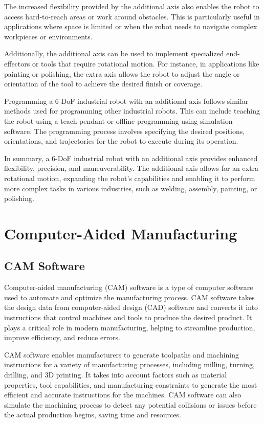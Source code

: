 The increased flexibility provided by the additional axis also enables the robot to access hard-to-reach areas or work around obstacles. This is particularly useful in applications where space is limited or when the robot needs to navigate complex workpieces or environments.

Additionally, the additional axis can be used to implement specialized end-effectors or tools that require rotational motion. For instance, in applications like painting or polishing, the extra axis allows the robot to adjust the angle or orientation of the tool to achieve the desired finish or coverage.

Programming a 6-DoF industrial robot with an additional axis follows similar methods used for programming other industrial robots. This can include teaching the robot using a teach pendant or offline programming using simulation software. The programming process involves specifying the desired positions, orientations, and trajectories for the robot to execute during its operation.

In summary, a 6-DoF industrial robot with an additional axis provides enhanced flexibility, precision, and maneuverability. The additional axis allows for an extra rotational motion, expanding the robot's capabilities and enabling it to perform more complex tasks in various industries, such as welding, assembly, painting, or polishing.

\section{Computer-Aided Manufacturing}\label{CAMmain}
\subsection{CAM Software}
Computer-aided manufacturing (CAM) software is a type of computer software used to automate and optimize the manufacturing process. CAM software takes the design data from computer-aided design (CAD) software and converts it into instructions that control machines and tools to produce the desired product. It plays a critical role in modern manufacturing, helping to streamline production, improve efficiency, and reduce errors.

CAM software enables manufacturers to generate toolpaths and machining instructions for a variety of manufacturing processes, including milling, turning, drilling, and 3D printing. It takes into account factors such as material properties, tool capabilities, and manufacturing constraints to generate the most efficient and accurate instructions for the machines. CAM software can also simulate the machining process to detect any potential collisions or issues before the actual production begins, saving time and resources.


